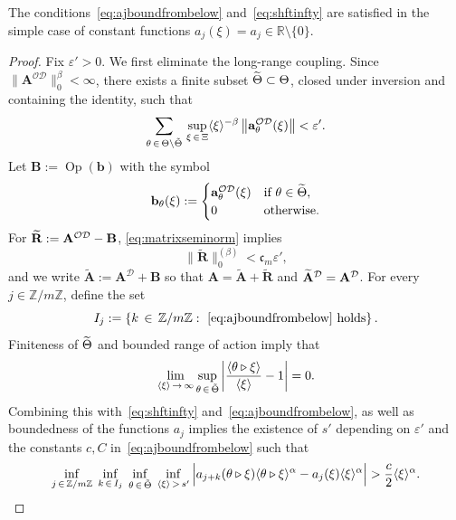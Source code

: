 \documentclass[AHL,Unicode,longabstracts,published]{cedram}
\DeclareMathOperator{\Op}{Op}
\newcommand{\R}{\mathbb R}
\newcommand{\Z}{\mathbb Z}
\newcommand{\CD}{\mathcal{D}}
\newcommand{\CO}{\mathcal{O}}
\newcommand{\COD}{{\CO\CD}}
\newcommand{\ba}{\mathbf a}
\newcommand{\BA}{\mathbf A}
\newcommand{\BB}{\mathbf B}
\newcommand{\BR}{\mathbf R}
\newcommand{\bbb}{\mathbf b}
\newcommand{\Fc}{\mathfrak c}
\newcommand{\eps}{\varepsilon}
\renewcommand{\epsilon}{\varepsilon}
\newcommand{\act}{\triangleright}
\renewcommand{\subseteq}{\subset}
\newcommand{\abs}[1]{\left\lvert #1 \right\rvert}
\newcommand{\set}[1]{\left\{ #1 \right\}}
\newcommand{\norm}[1]{\left\| #1 \right\|}
\newcommand{\ang}[1]{\langle #1 \rangle}
\let\oldtilde\tilde
\renewcommand*{\tilde}[1]{\mathchoice{\widetilde{#1}}{\widetilde{#1}}{\oldtilde{#1}}{\oldtilde{#1}}}
\begin{document}
\begin{rema}
The conditions~\eqref{eq:ajboundfrombelow} and~\eqref{eq:shftinfty} are satisfied in the simple case of constant functions $a_j(\xi)=a_j\in\R\setminus
\{0\}$.
\end{rema}
\begin{proof}
Fix $\epsilon' > 0$. We first eliminate the long-range coupling. Since $\|\BA^{\COD}\|^{\beta}_{0} < \infty$, there exists a finite subset $\tilde{\Theta} \subseteq \Theta$, closed under inversion and containing the identity, such that
\begin{equation}\label{eq:smallnorm}
\sum_{\theta\,\in\,\Theta \setminus \tilde \Theta}\,
\sup_{\xi\,\in\,\Xi} \ang \xi^{-\beta}\norm{\ba_\theta^{\COD}(\xi)} < \epsilon'.
\end{equation}
Let $\BB:= \Op(\bbb)$ with the symbol
\begin{equation}\label{eq:btilde}
\bbb_\theta(\xi) :=
\begin{cases}
\ba_\theta^{\COD}(\xi) & \text{if } \theta \in \tilde \Theta, \\
0 & \text{otherwise.}
\end{cases}
\end{equation}
For $\tilde \BR: = \BA^{\COD} - \BB$, \eqref{eq:matrixseminorm} implies
\begin{equation}\label{eq:estRtilde}
\big\|\widetilde{\BR}\big\|_{0}^{(\beta)} < \Fc_m\epsilon',
\end{equation}
and we write $\widetilde{\BA}:= \BA^\CD + \BB$ so that $\BA=\widetilde{\BA}+\widetilde{\BR}$ and $\tilde \BA^\CD = \BA^\CD$. For every $j \in \Z/m\Z$, define the set
\begin{equation}\label{eq:specificconstants}
I_j := \set{k\,\in\,\Z/m\Z :~\eqref{eq:ajboundfrombelow} \text{ holds}}.
\end{equation}
Finiteness of $\tilde \Theta$ and bounded range of action imply that
\begin{equation}
\lim_{\ang \xi\,\to\,\infty} \sup_{\theta\,\in\,\tilde \Theta} \abs{\frac{\ang{\theta
\act \xi}}{\ang \xi} -1} = 0.
\end{equation}
Combining this with~\eqref{eq:shftinfty} and~\eqref{eq:ajboundfrombelow}, as well as boundedness of the functions $a_j$ implies the existence of $s'$ depending on $\eps'$ and the constants $c, C$ in~\eqref{eq:ajboundfrombelow} such that
\begin{equation}
\inf_{j\,\in\,\Z / m \Z} \; \inf_{k\,\in\,I_j} \; \inf_{\theta\,\in
\,\tilde \Theta} \;
\inf_{\ang \xi\,>\,s'} \Big|a_{j+k}(\theta \act \xi) \ang{\theta \act \xi}^\alpha - a_j(\xi) \ang \xi^\alpha\Big| > \frac c 2 \ang \xi^\alpha.

\end{equation}
\end{proof}
\end{document}
